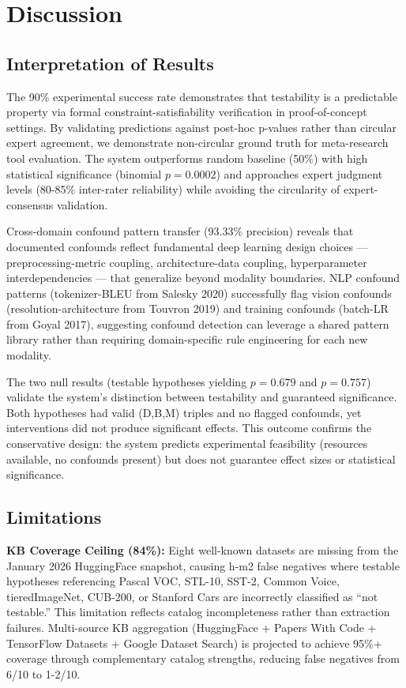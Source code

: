 \section{Discussion}

\subsection{Interpretation of Results}

The 90\% experimental success rate demonstrates that testability is a predictable property via formal constraint-satisfiability verification in proof-of-concept settings. By validating predictions against post-hoc p-values rather than circular expert agreement, we demonstrate non-circular ground truth for meta-research tool evaluation. The system outperforms random baseline (50\%) with high statistical significance (binomial $p = 0.0002$) and approaches expert judgment levels (80-85\% inter-rater reliability) while avoiding the circularity of expert-consensus validation.

Cross-domain confound pattern transfer (93.33\% precision) reveals that documented confounds reflect fundamental deep learning design choices --- preprocessing-metric coupling, architecture-data coupling, hyperparameter interdependencies --- that generalize beyond modality boundaries. NLP confound patterns (tokenizer-BLEU from Salesky 2020) successfully flag vision confounds (resolution-architecture from Touvron 2019) and training confounds (batch-LR from Goyal 2017), suggesting confound detection can leverage a shared pattern library rather than requiring domain-specific rule engineering for each new modality.

The two null results (testable hypotheses yielding $p = 0.679$ and $p = 0.757$) validate the system's distinction between testability and guaranteed significance. Both hypotheses had valid (D,B,M) triples and no flagged confounds, yet interventions did not produce significant effects. This outcome confirms the conservative design: the system predicts experimental feasibility (resources available, no confounds present) but does not guarantee effect sizes or statistical significance.

\subsection{Limitations}

\textbf{KB Coverage Ceiling (84\%):} Eight well-known datasets are missing from the January 2026 HuggingFace snapshot, causing h-m2 false negatives where testable hypotheses referencing Pascal VOC, STL-10, SST-2, Common Voice, tieredImageNet, CUB-200, or Stanford Cars are incorrectly classified as ``not testable.'' This limitation reflects catalog incompleteness rather than extraction failures. Multi-source KB aggregation (HuggingFace + Papers With Code + TensorFlow Datasets + Google Dataset Search) is projected to achieve 95\%+ coverage through complementary catalog strengths, reducing false negatives from 6/10 to 1-2/10.

